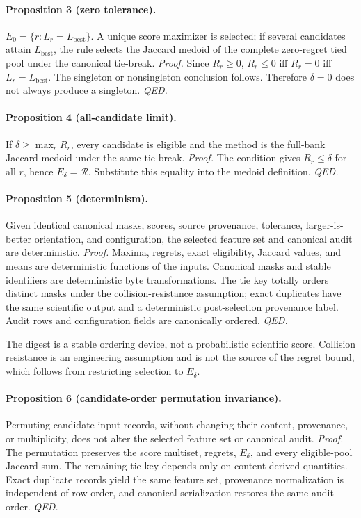 \paragraph{Proposition 3 (zero tolerance).}
$E_0=\{r:L_r=L_{\mathrm{best}}\}$. A unique score maximizer is selected; if
several candidates attain $L_{\mathrm{best}}$, the rule selects the Jaccard
medoid of the complete zero-regret tied pool under the canonical tie-break.
\emph{Proof.} Since $R_r\geq0$, $R_r\leq0$ iff $R_r=0$ iff
$L_r=L_{\mathrm{best}}$. The singleton or nonsingleton conclusion follows.
Therefore $\delta=0$ does not always produce a singleton. \emph{QED.}

\paragraph{Proposition 4 (all-candidate limit).}
If $\delta\geq\max_rR_r$, every candidate is eligible and the method is the
full-bank Jaccard medoid under the same tie-break.
\emph{Proof.} The condition gives $R_r\leq\delta$ for all $r$, hence
$E_\delta=\mathcal R$. Substitute this equality into the medoid definition.
\emph{QED.}

\paragraph{Proposition 5 (determinism).}
Given identical canonical masks, scores, source provenance, tolerance,
larger-is-better orientation, and configuration, the selected feature set and
canonical audit are deterministic.
\emph{Proof.} Maxima, regrets, exact eligibility, Jaccard values, and means are
deterministic functions of the inputs. Canonical masks and stable identifiers are
deterministic byte transformations. The tie key totally orders distinct masks
under the collision-resistance assumption; exact duplicates have the same
scientific output and a deterministic post-selection provenance label. Audit
rows and configuration fields are canonically ordered. \emph{QED.}

The digest is a stable ordering device, not a probabilistic scientific score.
Collision resistance is an engineering assumption and is not the source of
the regret bound, which follows from restricting selection to $E_\delta$.

\paragraph{Proposition 6 (candidate-order permutation invariance).}
Permuting candidate input records, without changing their content, provenance,
or multiplicity, does not alter the selected feature set or canonical audit.
\emph{Proof.} The permutation preserves the score multiset, regrets,
$E_\delta$, and every eligible-pool Jaccard sum. The remaining tie key depends
only on content-derived quantities. Exact duplicate records yield the same
feature set, provenance normalization is independent of row order, and
canonical serialization restores the same audit order. \emph{QED.}


